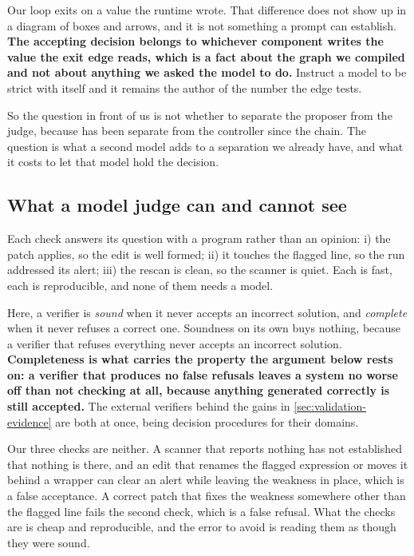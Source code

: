 Our loop exits on a value the runtime wrote. That difference does not show up in a diagram of boxes
and arrows, and it is not something a prompt can establish. \textbf{The accepting decision belongs
to whichever component writes the value the exit edge reads, which is a fact about the graph we
compiled and not about anything we asked the model to do.} Instruct a model to be strict with itself
and it remains the author of the number the edge tests.

So the question in front of us is not whether to separate the proposer from the judge, because
 has been separate from the controller since the chain. The question is what a
second model adds to a separation we already have, and what it costs to let that model hold the
decision.

\subsection{What a model judge can and cannot see}
\label{sec:validation-judge}

Each check answers its question with a program rather than an opinion: i) the patch applies, so the
edit is well formed; ii) it touches the flagged line, so the run addressed its alert; iii) the
rescan is clean, so the scanner is quiet. Each is fast, each is reproducible,
and none of them needs a model.

Here, a verifier is \emph{sound} when it never accepts an incorrect solution, and \emph{complete}
when it never refuses a correct one. Soundness on its own buys nothing, because a verifier that
refuses everything never accepts an incorrect solution. \textbf{Completeness is what carries the
property the argument below rests on: a verifier that produces no false refusals leaves a system no
worse off than not checking at all, because anything generated correctly is still accepted.} The
external verifiers behind the gains in \cref{sec:validation-evidence} are both at once, being
decision procedures for their domains.

Our three checks are neither. A scanner that reports nothing has not established that nothing is
there, and an edit that renames the flagged expression or moves it behind a wrapper can clear an
alert while leaving the weakness in place, which is a false acceptance. A correct patch that fixes
the weakness somewhere other than the flagged line fails the second check, which is a false refusal.
What the checks are is cheap and reproducible, and the error to avoid is reading them as though they
were sound.

